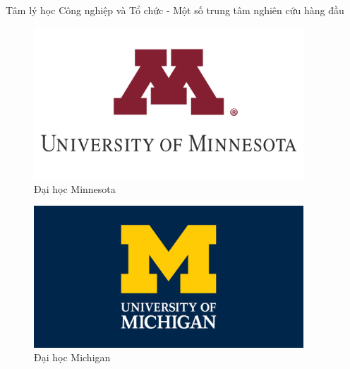\documentclass[../main.tex]{subfiles}
\begin{document}
\begin{frame}{Tâm lý học Công nghiệp và Tổ chức - Một số trung tâm nghiên cứu hàng đầu}
    \begin{minipage}{0.5\textwidth}
        \begin{figure}
            \centering
            \includegraphics[width=0.9\textwidth]{anh/Minnesota.png}
            \caption{Đại học Minnesota}
        \end{figure}
    \end{minipage}\hfill
    \begin{minipage}{0.5\textwidth}
        \begin{figure}
            \centering
            \includegraphics[width=0.9\textwidth]{anh/Michigan.jpg}
            \caption{Đại học Michigan}
        \end{figure}
    \end{minipage}
\end{frame}
\end{document}
